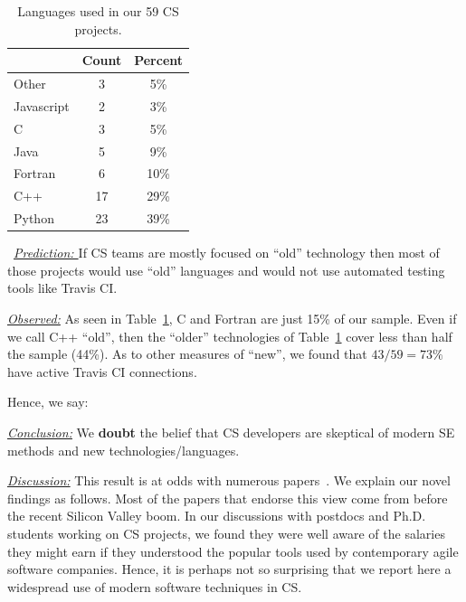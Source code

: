\documentclass[sigconf,review,anonymous]{acmart}
\newenvironment{RQ}{\vspace{1mm}\begin{tcolorbox}[enhanced,width=3.4in,size=fbox,colback=red!5!white,drop shadow southeast,sharp corners]}{\end{tcolorbox}}
\begin{document}
\begin{table}

\caption{Languages used in our 59 CS projects.  
}\label{tbl:language}
 \footnotesize
 \hspace{-3pt}\begin{tabular}{l|c|c}
 \multicolumn{1}{c|}{} & \multicolumn{1}{c|}{Count} & \multicolumn{1}{c}{Percent}\\
\hline
Other & 3 &  5\%  \\ 
Javascript	& 2 & 3\% \\ 
C &	3 & 5\% \\ 
Java	& 5 & 9\% \\ 
Fortran	& 6 & 10\% \\
C++	& 17 & 29\% \\
Python & 23 & 39\% 
\end{tabular}
\end{table} \noindent ~\textit{\underline{Prediction: }} If CS teams are mostly focused on ``old'' technology then most of those projects would use ``old'' languages and would not use automated testing
tools like  Travis CI.







\noindent\textit{\underline{Observed:}} 
As seen in Table~\ref{tbl:language}, C and Fortran are just 15\% of our sample.
Even if we call C++ ``old'', then the ``older'' technologies of Table~\ref{tbl:language}
cover less than half the sample (44\%).
 As to other measures of ``new'', we found that  $43/59=73\%$
have active
Travis CI connections.  

 

Hence, we say:

\begin{RQ} 
\textit{\underline{Conclusion:}} We \textbf{doubt} the belief that 
CS developers are skeptical of modern SE methods and new technologies/languages.
\end{RQ}

\noindent \textit{\underline{Discussion:}} This result is at odds
with numerous papers~\cite{basili08_hpc, carver07_environment, Prabhu11_cssurvey, kendall05_C, ragan14_pythoncs}. We explain our novel findings as follows. 
Most of the papers that endorse this view come from before the recent Silicon Valley boom. In our discussions with postdocs and Ph.D. students working on CS projects,
we found they were well aware of the salaries they might earn if they understood the popular tools used by contemporary agile software companies. 
Hence, it is perhaps not so surprising that we report here a widespread use of modern software techniques in CS.
 
\end{document}
